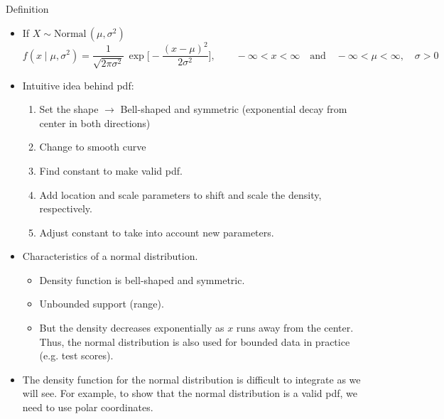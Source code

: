 \documentclass{article}
\newcommand{\follow}[1]{\sim \text{#1}\,}		%
\begin{document}
Definition\bigskip
\begin{itemize}
    \item If $X \follow{Normal}(\mu, \sigma^2)$
    \[f(x \mid \mu, \sigma^2) = \frac{1}{\sqrt{2 \pi \sigma^2}} \, \exp\bigg[-\frac{(x - \mu)^2}{2\sigma^2}\bigg], \quad\quad -\infty < x < \infty \quad \text{and}\quad -\infty < \mu < \infty, \quad \sigma > 0\]\vspace{30pt}
    \item Intuitive idea behind pdf:
    \begin{enumerate}
        \item Set the shape $\rightarrow$ Bell-shaped and symmetric (exponential decay from center in both directions)
        \item Change to smooth curve
        \item Find constant to make valid pdf.
        \item Add location and scale parameters to shift and scale the density, respectively.
        \item Adjust constant to take into account new parameters.
    \end{enumerate}
    \item Characteristics of a normal distribution.
    \begin{itemize}
        \item Density function is bell-shaped and symmetric.
        \item Unbounded support (range).
        \item[] But the density decreases exponentially as $x$ runs away from the center. Thus, the normal distribution is also used for bounded data in practice (e.g. test scores).
    \end{itemize}\smallskip
    \item The density function for the normal distribution is difficult to integrate as we will see. For example, to show that the normal distribution is a valid pdf, we need to use polar coordinates.
\end{itemize}\bigskip
\end{document}
